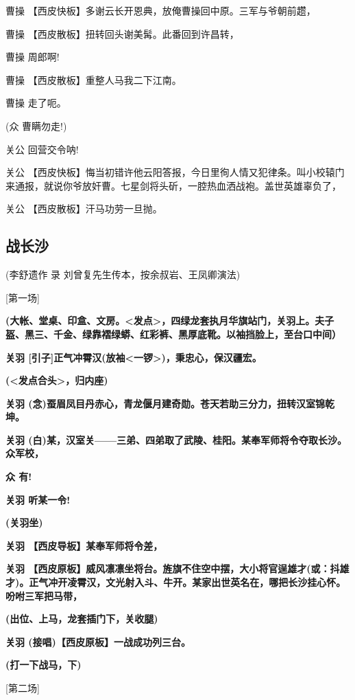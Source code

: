 曹操 【西皮快板】多谢云长开恩典，放俺曹操回中原。三军与爷朝前趱，

曹操 【西皮散板】扭转回头谢美髯。此番回到许昌转，

曹操 周郎啊!

曹操 【西皮散板】重整人马我二下江南。

曹操 走了呃。

(众 曹瞒勿走!)

关公 回营交令呐!

关公
【西皮快板】悔当初错许他云阳答报，今日里徇人情又犯律条。叫小校辕门来通报，就说你爷放奸曹。七星剑将头斫，一腔热血洒战袍。盖世英雄辜负了，

关公 【西皮散板】汗马功劳一旦抛。

\hypertarget{ux6218ux957fux6c99}{%
\subsection{战长沙}\label{ux6218ux957fux6c99}}

(李舒遗作 录 刘曾复先生传本，按余叔岩、王凤卿演法)

{[}第一场{]}

\textbf{(大帐、堂桌、印盒、文房。\textless{}发点\textgreater{}，四绿龙套执月华旗站门，关羽上。夫子盔、黑三、千金、绿靠褶绿蟒、红彩裤、黑厚底靴。以袖挡脸上，至台口中间）}

\textbf{关羽
{[}引子{]}正气冲霄汉(放袖\textless{}一锣\textgreater{})，秉忠心，保汉疆宏。}

\textbf{(\textless{}发点合头\textgreater{}，归内座)}

\textbf{关羽
(念)蚕眉凤目丹赤心，青龙偃月建奇勋。苍天若助三分力，扭转汉室锦乾坤。}

\textbf{关羽
(白)某，汉室关------三弟、四弟取了武陵、桂阳。某奉军师将令夺取长沙。众军校，}

\textbf{众 有!}

\textbf{关羽 听某一令!}

\textbf{(关羽坐)}

\textbf{关羽 【西皮导板】某奉军师将令差，}

\textbf{关羽
【西皮原板】威风凛凛坐将台。旌旗不住空中摆，大小将官逞雄才(或：抖雄才)。正气冲开凌霄汉，文光射入斗、牛开。某家出世英名在，哪把长沙挂心怀。吩咐三军把马带，}

\textbf{(出位、上马，龙套插门下，关收腿)}

\textbf{关羽 (接唱)【西皮原板】一战成功列三台。}

\textbf{(打一下战马，下)}

{[}第二场{]}

